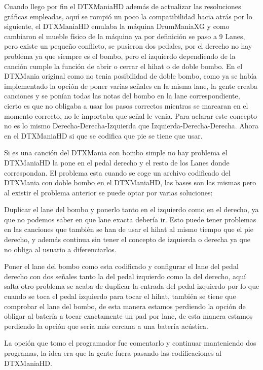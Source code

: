 \documentclass[a4paper,11pt,oneside]{book}
\begin{document}
Cuando llego por fin el DTXManiaHD además de actualizar las resoluciones gráficas empleadas, aquí se rompió un poco la compatibilidad hacia atrás por lo siguiente, el DTXManiaHD emulaba la máquina DrumManiaXG y como cambiaron el mueble físico de la máquina ya por definición se paso a 9 \gls{Lanes}, pero existe un pequeño conflicto, se pusieron dos pedales, por el derecho no hay problema ya que siempre es el bombo, pero el izquierdo dependiendo de la canción cumple la función de abrir o cerrar el hihat o de doble bombo.
En el DTXMania original como no tenia posibilidad de doble bombo, como ya se había implementado la opción de poner varias señales en la misma lane, la gente creaba canciones y se ponían todas las notas del bombo en la lane correspondiente, cierto es que no obligaba a usar los pasos correctos mientras se marcaran en el momento correcto, no le importaba que señal le venia. Para aclarar este concepto no es lo mismo Derecha-Derecha-Izquierda que Izquierda-Derecha-Derecha. Ahora en el DTXManiaHD si que se codifica que pie se tiene que usar.

Si es una canción del DTXMania con bombo simple no hay problema el DTXManiaHD la pone en el pedal derecho y el resto de los \gls{Lanes} donde correspondan.
El problema esta cuando se coge un archivo codificado del DTXMania con doble bombo en el DTXManiaHD, las bases son las mismas pero al existir el problema anterior se puede optar por varias soluciones:

  Duplicar el lane del bombo y ponerlo tanto en el izquierdo como en el derecho, ya que no podemos saber en que lane exacta debería ir. Esto puede tener problemas en las canciones que también se han de usar el hihat al mismo tiempo que el pie derecho, y además continua sin tener el concepto de izquierda o derecha ya que no obliga al usuario a diferenciarlos. 
  
  Poner el lane del bombo como esta codificado y configurar el lane del pedal derecho con dos señales tanto la del pedal izquierdo como la del derecho, aquí salta otro problema se acaba de duplicar la entrada del pedal izquierdo  por lo que cuando se toca el pedal izquierdo para tocar el hihat, también se tiene que comprobar el lane del bombo, de esta manera estamos perdiendo la opción de obligar al batería a tocar exactamente un pad por lane, de esta manera estamos perdiendo la opción que seria más cercana a una batería acústica.
  
  La opción que tomo el programador fue comentarlo y continuar manteniendo dos programas, la idea era que la gente fuera pasando las codificaciones al DTXManiaHD.
\end{document}
